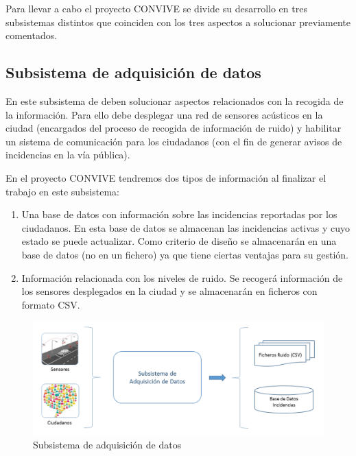 \documentclass[
  a4paper,
]{scrreport}
\providecommand{\tightlist}{%
  \setlength{\itemsep}{0pt}\setlength{\parskip}{0pt}}\usepackage{longtable,booktabs,array}
\begin{document}
Para llevar a cabo el proyecto CONVIVE se divide su desarrollo en tres
subsistemas distintos que coinciden con los tres aspectos a solucionar
previamente comentados.

\subsection{Subsistema de adquisición de
datos}\label{subsistema-de-adquisiciuxf3n-de-datos}

En este subsistema de deben solucionar aspectos relacionados con la
recogida de la información. Para ello debe desplegar una red de sensores
acústicos en la ciudad (encargados del proceso de recogida de
información de ruido) y habilitar un sistema de comunicación para los
ciudadanos (con el fin de generar avisos de incidencias en la vía
pública).

En el proyecto CONVIVE tendremos dos tipos de información al finalizar
el trabajo en este subsistema:

\begin{enumerate}
\def\labelenumi{\arabic{enumi}.}
\tightlist
\item
  Una base de datos con información sobre las incidencias reportadas por
  los ciudadanos. En esta base de datos se almacenan las incidencias
  activas y cuyo estado se puede actualizar. Como criterio de diseño se
  almacenarán en una base de datos (no en un fichero) ya que tiene
  ciertas ventajas para su gestión.
\item
  Información relacionada con los niveles de ruido. Se recogerá
  información de los sensores desplegados en la ciudad y se almacenarán
  en ficheros con formato CSV.
\end{enumerate}

\begin{figure}[H]

{\centering \includegraphics{../img/convive/subsistema-adquisicion-datos.png}

}

\caption{Subsistema de adquisición de datos}

\end{figure}%
\end{document}
